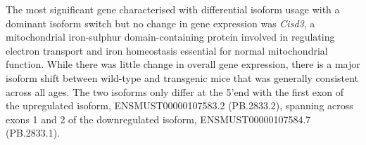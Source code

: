 The most significant gene characterised with differential isoform usage with a dominant isoform switch but no change in gene expression was \textit{Cisd3}, a mitochondrial iron-sulphur domain-containing protein involved in regulating electron transport and iron homeostasis essential for normal mitochondrial function. While there was little change in overall gene expression, there is a major isoform shift between wild-type and transgenic mice that was generally consistent across all ages. The two isoforms only differ at the 5'end with the first exon of the upregulated isoform, ENSMUST00000107583.2 (PB.2833.2), spanning across exons 1 and 2 of the downregulated isoform, ENSMUST00000107584.7 (PB.2833.1). 



